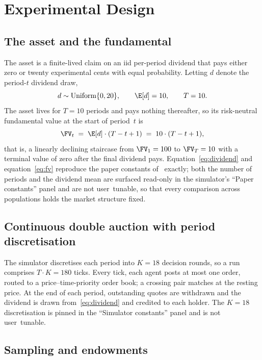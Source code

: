 \section{Experimental Design}
\label{sec:design}

\subsection{The asset and the fundamental}

The asset is a finite-lived claim on an iid per-period dividend
that pays either zero or twenty experimental cents with equal
probability. Letting $d$ denote the period-$t$ dividend draw,
\begin{equation}
d\sim\text{Uniform}\{0,20\},\qquad \E[d]=10,\qquad T=10.
\label{eq:dividend}
\end{equation}
The asset lives for $T=10$ periods and pays nothing thereafter,
so its risk-neutral fundamental value at the start of period~$t$ is
\begin{equation}
\FV_t \;=\; \E[d]\cdot(T-t+1) \;=\; 10\cdot(T-t+1),
\label{eq:fv}
\end{equation}
that is, a linearly declining staircase from $\FV_1=100$ to
$\FV_T=10$ with a terminal value of zero after the final dividend
pays. Equation~\eqref{eq:dividend} and equation~\eqref{eq:fv}
reproduce the paper constants of~\citet{dufwenberg2005bubbles}
exactly; both the number of periods and the dividend mean are
surfaced read-only in the simulator's ``Paper constants'' panel and
are not user~tunable, so that every comparison across populations
holds the market structure fixed.

\subsection{Continuous double auction with period discretisation}

The simulator discretises each period into $K=18$ decision rounds,
so a run comprises $T\cdot K=180$ ticks. Every tick, each agent
posts at most one order, routed to a price--time-priority order
book; a crossing pair matches at the resting price. At the end of
each period, outstanding quotes are withdrawn and the dividend is
drawn from~\eqref{eq:dividend} and credited to each holder. The
$K=18$ discretisation is pinned in the ``Simulator constants''
panel and is not user~tunable.

\subsection{Sampling and endowments}

